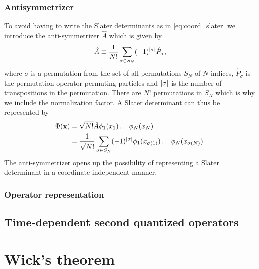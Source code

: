             \subsubsection{Antisymmetrizer}
                To avoid having to write the Slater determinants as in
                \autoref{eq:coord_slater} we introduce the anti-symmetrizer
                $\hat{A}$ which is given by
                \begin{align}
                    \hat{A}
                    \equiv
                    \frac{1}{N!}
                    \sum_{\sigma \in S_N}
                    (-1)^{\abs{\sigma}}
                    \hat{P}_{\sigma},
                \end{align}
                where $\sigma$ is a permutation from the set of all permutations
                $S_N$ of $N$ indices, $\hat{P}_{\sigma}$ is the permutation
                operator permuting particles and $\abs{\sigma}$ is the number of
                transpositions in the permutation.
                There are $N!$ permutations in $S_N$ which is why we include the
                normalization factor.
                A Slater determinant can thus be represented by
                \begin{align}
                    \Phi(\mathbf{x})
                    &=
                    \sqrt{N!}\hat{A}\phi_1(x_1)\dots\phi_N(x_N)
                    \\
                    &= \frac{1}{\sqrt{N!}}
                    \sum_{\sigma \in S_N} (-1)^{\abs{\sigma}}
                    \phi_1(x_{\sigma(1)})\dots\phi_N(x_{\sigma(N)}).
                \end{align}
                The anti-symmetrizer opens up the possibility of representing a
                Slater determinant in a coordinate-independent manner.

            \subsubsection{Operator representation}

        \subsection{Time-dependent second quantized operators}


    \section{Wick's theorem}
